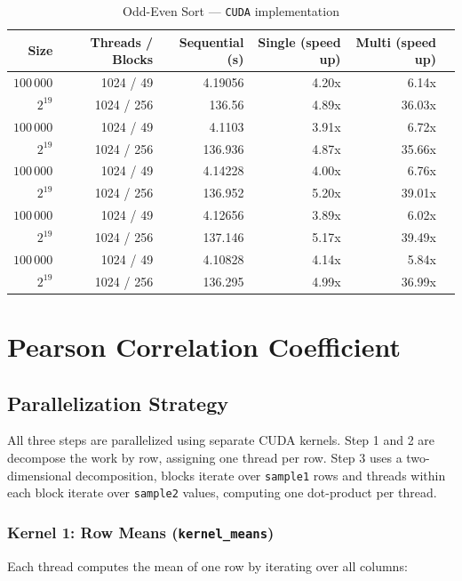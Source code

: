 \documentclass[11pt,a4paper]{article}
\begin{document}
\begin{table}[h]
\centering
\begin{tabular}{|r|r|r|r|r|r|}
\hline
\textbf{Size} & \textbf{Threads / Blocks} & \textbf{Sequential (s)} & \textbf{Single (speed up)} & \textbf{Multi (speed up)} \\
\hline
$100\,000$ & 1024 / 49 & 4.19056 & 4.20x & 6.14x \\
$2^{19}$ & 1024 / 256 & 136.56 & 4.89x & 36.03x \\
$100\,000$ & 1024 / 49 & 4.1103 & 3.91x & 6.72x \\
$2^{19}$ & 1024 / 256 & 136.936 & 4.87x & 35.66x \\
$100\,000$ & 1024 / 49 & 4.14228 & 4.00x & 6.76x \\
$2^{19}$ & 1024 / 256 & 136.952 & 5.20x & 39.01x \\
$100\,000$ & 1024 / 49 & 4.12656 & 3.89x & 6.02x \\
$2^{19}$ & 1024 / 256 & 137.146 & 5.17x & 39.49x \\
$100\,000$ & 1024 / 49 & 4.10828 & 4.14x & 5.84x \\
$2^{19}$ & 1024 / 256 & 136.295 & 4.99x & 36.99x \\
\hline
\end{tabular}
\caption{Odd-Even Sort --- \texttt{CUDA} implementation}
\end{table}

\section{Pearson Correlation Coefficient}

\subsection{Parallelization Strategy}

All three steps are parallelized using separate CUDA kernels. Step 1 and 2 are decompose the work by row, assigning one thread per row. Step 3 uses a two-dimensional decomposition, blocks iterate over \texttt{sample1} rows and threads within each block iterate over \texttt{sample2} values, computing one dot-product per thread.

\subsubsection{Kernel 1: Row Means (\texttt{kernel\_means})}

Each thread computes the mean of one row by iterating over all columns:
\end{document}

